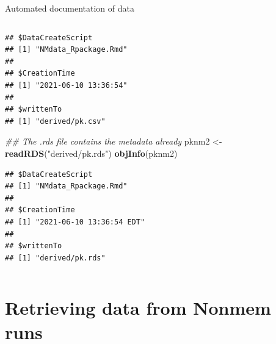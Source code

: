 \documentclass[
  8pt,
  ignorenonframetext,
  aspectratio=169]{beamer}
\newenvironment{Shaded}{\begin{snugshade}}{\end{snugshade}}
\newcommand{\CommentTok}[1]{\textcolor[rgb]{0.56,0.35,0.01}{\textit{#1}}}
\newcommand{\KeywordTok}[1]{\textcolor[rgb]{0.13,0.29,0.53}{\textbf{#1}}}
\newcommand{\NormalTok}[1]{#1}
\newcommand{\StringTok}[1]{\textcolor[rgb]{0.31,0.60,0.02}{#1}}
\begin{document}
\begin{frame}[fragile]{Automated documentation of data}
\begin{columns}[T]
\begin{column}{0.48\textwidth}
\begin{verbatim}
## $DataCreateScript
## [1] "NMdata_Rpackage.Rmd"
## 
## $CreationTime
## [1] "2021-06-10 13:36:54"
## 
## $writtenTo
## [1] "derived/pk.csv"
\end{verbatim}

\begin{Shaded}
\begin{Highlighting}[]
\CommentTok{\#\# The .rds file contains the metadata already}
\NormalTok{pknm2 \textless{}{-}}\StringTok{ }\KeywordTok{readRDS}\NormalTok{(}\StringTok{"derived/pk.rds"}\NormalTok{)}
\KeywordTok{objInfo}\NormalTok{(pknm2)}
\end{Highlighting}
\end{Shaded}

\begin{verbatim}
## $DataCreateScript
## [1] "NMdata_Rpackage.Rmd"
## 
## $CreationTime
## [1] "2021-06-10 13:36:54 EDT"
## 
## $writtenTo
## [1] "derived/pk.rds"
\end{verbatim}
\end{column}
\end{columns}

\normalsize
\end{frame}

\hypertarget{retrieving-data-from-nonmem-runs}{%
\section{Retrieving data from Nonmem
runs}\label{retrieving-data-from-nonmem-runs}}
\end{document}
